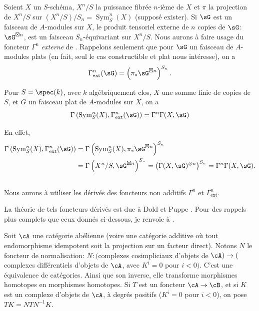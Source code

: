 Soient $X$ un $S$-schéma, $X^n/S$ la puissance fibrée $n$-ième de $X$ et 
$\pi$ la projection de $X^n/S$ sur $(X^n/S)/S_n=\operatorname{Sym}_S^n(X)$ 
(supposé exister). Si $\sG$ est un faisceau de $A$-modules sur $X$, le 
produit tensoriel externe de $n$ copies de $\sG$: $\sG^{\boxtimes n}$, est un 
faisceau $S_n$-équivariant sur $X^n/S$. Nous aurons à faire usage du 
foncteur $\Gamma^n$ \emph{externe} de \cite[XVII 5.5.7 à 9]{sga4}. Rappelons 
seulement que pour $\sG$ un faisceau de $A$-modules plats (en fait, seul le cas 
constructible et plat nous intéresse), on a 
\[
  \Gamma_\text{ext}^n(\sG) = \left(\pi_*\sG^{\boxtimes n}\right)^{S_n} \text{.}
\]





\begin{lemma_}\label{III:1-3}
Pour $S=\spec(k)$, avec $k$ algébriquement clos, $X$ une somme finie de 
copies de $S$, et $G$ un faisceau plat de $A$-modules sur $X$, on a 
\[
  \Gamma\left(\operatorname{Sym}_S^n(X),\Gamma_\text{ext}^n(\sG)\right) = \Gamma^n \Gamma(X,\sG)
\]
\end{lemma_}

En effet, 
\begin{align*}
  \Gamma\left(\operatorname{Sym}_S^n(X),\Gamma_\text{ext}^n(\sG)\right) 
    &= \Gamma\left(\operatorname{Sym}_S^n(X),\pi_*\sG^{\boxtimes n}\right)^{S_n} \\
    &= \Gamma\left(X^n/S,\sG^{\boxtimes n}\right)^{S_n} 
    = \left(\Gamma(X,\sG)^{\otimes n}\right)^{S_n} 
    = \Gamma^n \Gamma(X,\sG) \text{.}
\end{align*}





\subsection{}\label{III:1-4}

Nous aurons à utiliser les dérivés des foncteurs non additifs $\Gamma^n$ 
et $\Gamma_\text{ext}^n$. 

La théorie de tels foncteurs dérivés est due à Dold et Puppe 
. Pour des rappels plus complets que ceux donnés ci-dessous, je 
renvoie à \cite[XVII 5.5.3]{sga4}. 

Soit $\cA$ une catégorie abélienne (voire une catégorie additive où 
tout endomorphisme idempotent soit la projection sur un facteur direct). Notons 
$N$ le foncteur de normalisation: $N:($complexes cosimpliciaux d'objets de 
$\cA)\to($complexes différentiels d'objets de $\cA$, avec $K^i=0$ pour 
$i<0)$. C'est une équivalence de catégories. Ainsi que son inverse, elle 
transforme morphismes homotopes en morphismes homotopes. Si $T$ est un foncteur 
$\cA\to\cB$, et si $K$ est un complexe d'objets de $\cA$, à degrés 
positifs ($K^i=0$ pour $i<0$), on pose $T K=N T N^{-1} K$. 






